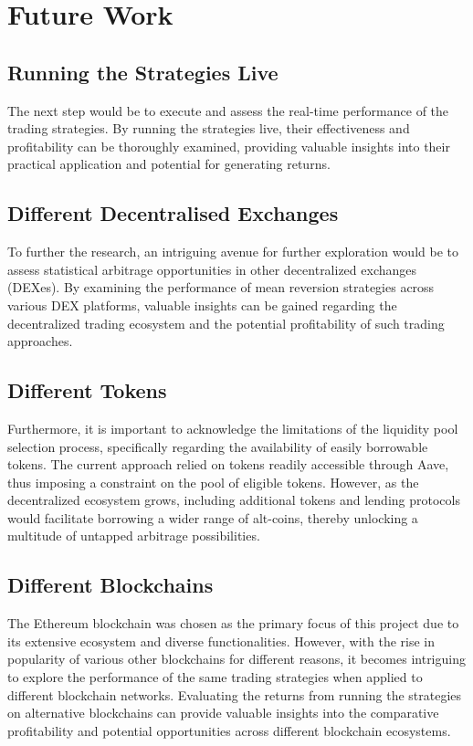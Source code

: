 \newpage
\section{Future Work}

\subsection{Running the Strategies Live}
The next step would be to execute and assess the real-time performance of the trading strategies. By running the strategies live, their effectiveness and profitability can be thoroughly examined, providing valuable insights into their practical application and potential for generating returns.

\subsection{Different Decentralised Exchanges}
To further the research, an intriguing avenue for further exploration would be to assess statistical arbitrage opportunities in other decentralized exchanges (DEXes). By examining the performance of mean reversion strategies across various DEX platforms, valuable insights can be gained regarding the decentralized trading ecosystem and the potential profitability of such trading approaches.

\subsection{Different Tokens}
Furthermore, it is important to acknowledge the limitations of the liquidity pool selection process, specifically regarding the availability of easily borrowable tokens. The current approach relied on tokens readily accessible through Aave, thus imposing a constraint on the pool of eligible tokens. However, as the decentralized ecosystem grows, including additional tokens and lending protocols would facilitate borrowing a wider range of alt-coins, thereby unlocking a multitude of untapped arbitrage possibilities.

\subsection{Different Blockchains}
The Ethereum blockchain was chosen as the primary focus of this project due to its extensive ecosystem and diverse functionalities. However, with the rise in popularity of various other blockchains for different reasons, it becomes intriguing to explore the performance of the same trading strategies when applied to different blockchain networks. Evaluating the returns from running the strategies on alternative blockchains can provide valuable insights into the comparative profitability and potential opportunities across different blockchain ecosystems.
